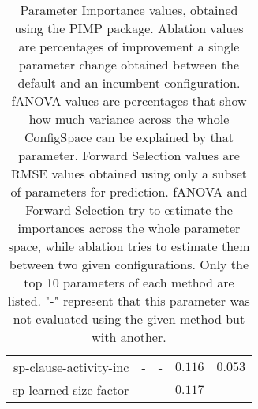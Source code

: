 \begin{table}
\begin{tabular}{r|r|r|r|r}
sp-clause-activity-inc      &                 - &                 - & $          0.116$ & $          0.053$\\
sp-learned-size-factor      &                 - &                 - & $          0.117$ &                 -\\
\bottomrule
\end{tabular}
\caption{Parameter Importance values, obtained using the PIMP package. Ablation values are percentages of improvement a single parameter change obtained between the default and an incumbent configuration.
fANOVA values are percentages that show how much variance across the whole ConfigSpace can be explained by that parameter.
Forward Selection values are RMSE values obtained using only a subset of parameters for prediction.
fANOVA and Forward Selection try to estimate the importances across the whole parameter space, while ablation tries to estimate them between two given configurations.
Only the top 10 parameters of each method are listed.
                    "-" represent that this parameter was not evaluated
                     using the given method but with another.
                    }
\label{tab:pimp}
\end{table}
